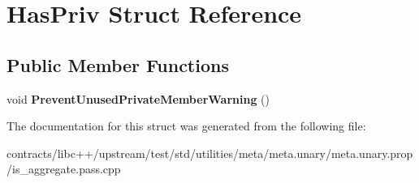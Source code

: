 \hypertarget{struct_has_priv}{}\section{Has\+Priv Struct Reference}
\label{struct_has_priv}
\subsection*{Public Member Functions}
\begin{DoxyCompactItemize}
\item 
\mbox{\label{struct_has_priv_a387f2dbe96198f6619077fdaee35892d}} 
void {\bfseries Prevent\+Unused\+Private\+Member\+Warning} ()
\end{DoxyCompactItemize}


The documentation for this struct was generated from the following file\+:\begin{DoxyCompactItemize}
\item 
contracts/libc++/upstream/test/std/utilities/meta/meta.\+unary/meta.\+unary.\+prop/is\+\_\+aggregate.\+pass.\+cpp\end{DoxyCompactItemize}
